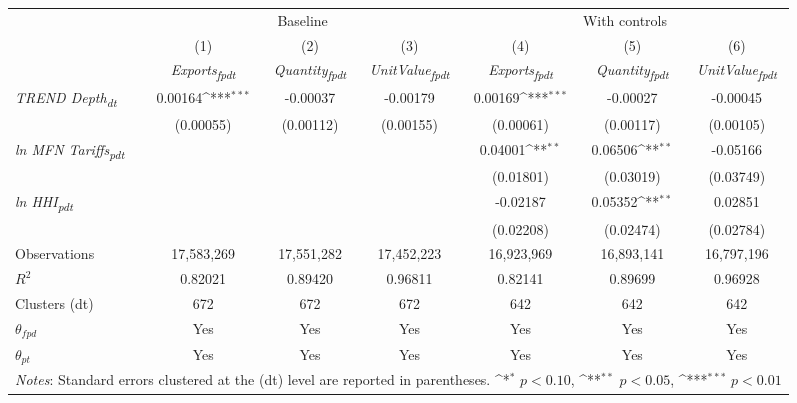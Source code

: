 {
\def\sym#1{\ifmmode^{#1}\else\(^{#1}\)\fi}
\begin{tabular}{l*{6}{c}}
\toprule
&\multicolumn{3}{c}{Baseline}&\multicolumn{3}{c}{With controls}\\\cmidrule(lr){2-4}\cmidrule(lr){5-7}
&(1)&(2)&(3)&(4)&(5)&(6)\\
&\textit{Exports\textsubscript{fpdt}}&\textit{Quantity\textsubscript{fpdt}}&\textit{UnitValue\textsubscript{fpdt}}&\textit{Exports\textsubscript{fpdt}}&\textit{Quantity\textsubscript{fpdt}}&\textit{UnitValue\textsubscript{fpdt}}\\
\midrule
\textit{TREND Depth\textsubscript{dt}} & 0.00164\sym{***} & -0.00037 & -0.00179 & 0.00169\sym{***} & -0.00027 & -0.00045\\
 & (0.00055) & (0.00112) & (0.00155) & (0.00061) & (0.00117) & (0.00105)\\
\addlinespace
\textit{ln MFN Tariffs\textsubscript{pdt}} &  &  &  & 0.04001\sym{**} & 0.06506\sym{**} & -0.05166\\
 &  &  &  & (0.01801) & (0.03019) & (0.03749)\\
\addlinespace
\textit{ln HHI\textsubscript{pdt}} &  &  &  & -0.02187 & 0.05352\sym{**} & 0.02851\\
 &  &  &  & (0.02208) & (0.02474) & (0.02784)\\
\midrule
Observations & 17,583,269 & 17,551,282 & 17,452,223 & 16,923,969 & 16,893,141 & 16,797,196\\
$R^{2}$ & 0.82021 & 0.89420 & 0.96811 & 0.82141 & 0.89699 & 0.96928\\
Clusters (dt) & 672 & 672 & 672 & 642 & 642 & 642\\
$\theta_{fpd}$ & Yes & Yes & Yes & Yes & Yes & Yes\\
$\theta_{pt}$ & Yes & Yes & Yes & Yes & Yes & Yes\\
\bottomrule
\multicolumn{7}{l}{\footnotesize \textit{Notes}: Standard errors clustered at the (dt) level are reported in parentheses. \sym{*} \(p<0.10\), \sym{**} \(p<0.05\), \sym{***} \(p<0.01\)}\\
\end{tabular}
}
